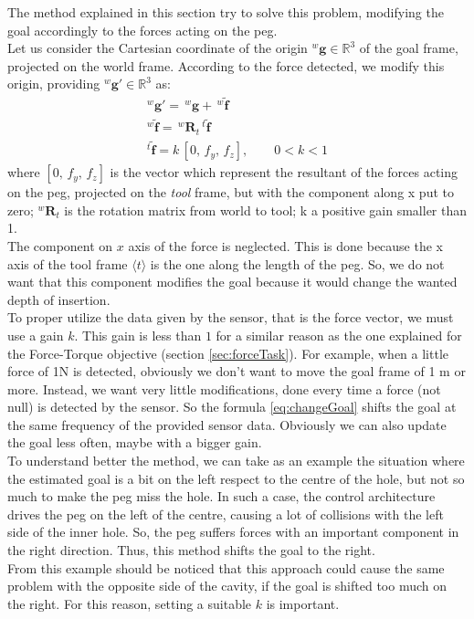 The method explained in this section try to solve this problem, modifying the goal accordingly to the forces acting on the peg.\\
Let us consider the Cartesian coordinate of the origin $^{w}\boldsymbol{g} \in \mathbb{R}^{3}$ of the goal frame, projected on the world frame. According to the force detected, we modify this origin, providing $^{w}\boldsymbol{g'} \in \mathbb{R}^{3}$ as:
\begin{equation}
	\label{eq:changeGoal}
	\begin{gathered}
	^{w}\boldsymbol{g'} = \,^{w}\boldsymbol{g} + \, ^{w}\boldsymbol{\tilde{f}} \\
	 ^{w}\boldsymbol{\tilde{f}} =  \,^{w}\boldsymbol{R}_t \,^{t}\boldsymbol{\tilde{f}} \\
	 ^{t}\boldsymbol{\tilde{f}} = k \, [ 0, \, f_y, \, f_z ], \qquad 0 < k < 1
%
	 \end{gathered}
\end{equation}
where $[ 0, \, f_y, \, f_z ]$ is the vector which represent the resultant of the forces acting on the peg, projected on the \textit{tool} frame, but with the component along x put to zero; $^{w}\boldsymbol{R}_t$ is the rotation matrix from world to tool; k a positive gain smaller than 1.\\
The component on $x$ axis of the force is neglected. This is done because the x axis of the tool frame $ \langle t \rangle $ is the one along the length of the peg. So, we do not want that this component modifies the goal because it would change the wanted depth of insertion.\\

To proper utilize the data given by the sensor, that is the force vector, we must use a gain $k$. This gain is less than $1$ for a similar reason as the one explained for the Force-Torque objective (section \ref{sec:forceTask}). For example, when a little force of 1N is detected, obviously we don't want to move the goal frame of 1 m or more. Instead, we want very little modifications, done every time a force (not null) is detected by the sensor. So the formula \eqref{eq:changeGoal} shifts the goal at the same frequency of the provided sensor data. Obviously we can also update the goal less often, maybe with a bigger gain.\\ 

To understand better the method, we can take as an example the situation where the estimated goal is a bit on the left respect to the centre of the hole, but not so much to make the peg miss the hole. In such a case, the control architecture drives the peg on the left of the centre, causing a lot of collisions with the left side of the inner hole. So, the peg suffers forces with an important component in the right direction. Thus, this method shifts the goal to the right.\\
From this example should be noticed that this approach could cause the same problem with the opposite side of the cavity, if the goal is shifted too much on the right. For this reason, setting a suitable $k$ is important.



